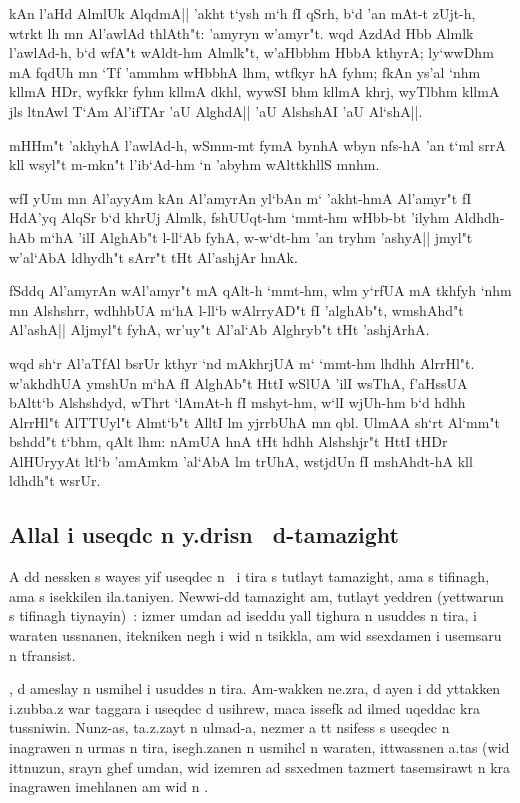 \documentclass[a4paper,11pt]{article}
\begin{document}
kAn l'aHd AlmlUk AlqdmA|| 'akht t`ysh m`h fI qSrh, b`d 'an mAt-t
zUjt-h, wtrkt lh mn Al'awlAd thlAth"t: 'amyryn w'amyr"t. wqd AzdAd Hbb
Almlk l'awlAd-h, b`d wfA"t wAldt-hm Almlk"t, w'aHbbhm HbbA kthyrA;
ly`wwDhm mA fqdUh mn `Tf 'ammhm wHbbhA lhm, wtfkyr hA fyhm; fkAn ys'al
`nhm kllmA HDr, wyfkkr fyhm kllmA dkhl, wywSI bhm kllmA khrj, wyTlbhm
kllmA jls ltnAwl T`Am Al'ifTAr 'aU AlghdA|| 'aU AlshshAI 'aU Al`shA||.

mHHm"t 'akhyhA l'awlAd-h, wSmm-mt fymA bynhA wbyn nfs-hA 'an t`ml srrA
kll wsyl"t m-mkn"t l'ib`Ad-hm `n 'abyhm wAlttkhllS mnhm.

wfI yUm mn Al'ayyAm kAn Al'amyrAn yl`bAn m` 'akht-hmA Al'amyr"t fI
HdA'yq AlqSr b`d khrUj Almlk, fshUUqt-hm `mmt-hm wHbb-bt 'ilyhm
Aldhdh-hAb m`hA 'ilI AlghAb"t l-ll`Ab fyhA, w-w`dt-hm 'an tryhm
'ashyA|| jmyl"t w'al`AbA ldhydh"t sArr"t tHt Al'ashjAr hnAk.

fSddq Al'amyrAn wAl'amyr"t mA qAlt-h `mmt-hm, wlm y`rfUA mA tkhfyh
`nhm mn Alshshrr, wdhhbUA m`hA l-ll`b wAlrryAD"t fI 'alghAb"t,
wmshAhd"t Al'ashA|| Aljmyl"t fyhA, wr'uy"t Al'al`Ab Alghryb"t tHt
'ashjArhA.

wqd sh`r Al'aTfAl bsrUr kthyr `nd mAkhrjUA m` `mmt-hm lhdhh
AlrrHl"t. w'akhdhUA ymshUn m`hA fI AlghAb"t HttI wSlUA 'ilI wsThA,
f'aHssUA bAltt`b Alshshdyd, wThrt `lAmAt-h fI mshyt-hm, w`lI wjUh-hm
b`d hdhh AlrrHl"t AlTTUyl"t Almt`b"t AlltI lm yjrrbUhA mn qbl.  UlmAA
sh`rt Al`mm"t bshdd"t t`bhm, qAlt lhm: nAmUA hnA tHt hdhh Alshshjr"t
HttI tHDr AlHUryyAt ltl`b 'amAmkm 'al`AbA lm trUhA, wstjdUn fI
mshAhdt-hA kll ldhdh"t wsrUr.  \popocplist

\pushocplist\ArabicBerberOCP

\subsection{Allal i useqdc n y.drisn \OMEGA\ d-tamazight}


A dd nessken s wayes yif useqdec n \OMEGA\ i tira s tutlayt tamazight,
ama s tifinagh, ama s isekkilen ila.taniyen. Newwi-dd tamazight am,
tutlayt yeddren (yettwarun s tifinagh tiynayin)~: izmer umdan ad
iseddu yall tighura n usuddes n tira, i waraten ussnanen, itekniken
negh i wid n tsikkla, am wid ssexdamen i usemsaru n tfransist.

\OMEGA, d ameslay n usmihel i usuddes n tira. Am-wakken ne.zra, d ayen
i dd yttakken i.zubba.z war taggara i useqdec d usihrew, maca issefk
ad ilmed uqeddac kra tussniwin. Nunz-as, ta.z.zayt n ulmad-a, nezmer a
tt nsifess s useqdec n inagrawen n urmas n tira, isegh.zanen n usmihcl
n waraten, ittwassnen a.tas (wid ittnuzun, srayn ghef umdan, wid
izemren ad ssxedmen tazmert tasemsirawt n kra inagrawen imehlanen am
wid n .
\end{document}
